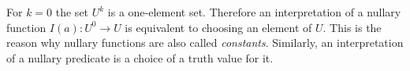 

\setcounter{section}{1}
\setcounter{subsection}{4}
\setcounter{dfn}{11}


For $k=0$ the set $U^k$ is a one-element set.
Therefore an interpretation of a nullary function $I(a) \colon U^0 \to U$ is equivalent to choosing an element of $U$.
This is the reason why nullary functions are also called \emph{constants}.
Similarly, an interpretation of a nullary predicate is a choice of a truth value for it.



